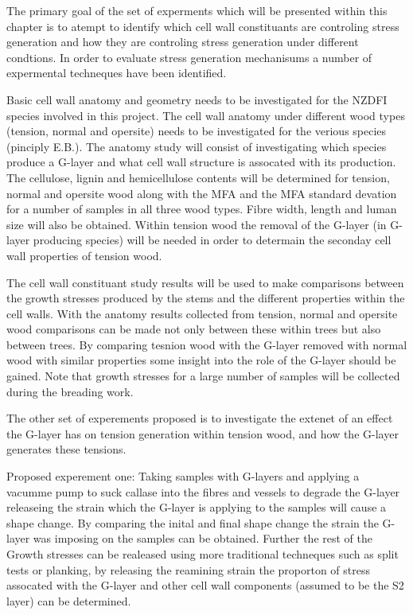 \documentclass{article}
\begin{document}
The primary goal of the set of experments which will be presented within this
chapter is to atempt to identify which cell wall constituants are controling
stress generation and how they are controling stress generation under different
condtions. In order to evaluate stress generation mechanisums a number of
expermental techneques have been identified.

Basic cell wall anatomy and geometry needs to be investigated for the NZDFI
species involved in this project. The cell wall anatomy under different wood
types (tension, normal and opersite) needs to be investigated for the verious
species (pinciply E.B.). The anatomy study will consist of investigating which
species produce a G-layer and what cell wall structure is assocated with its
production. The cellulose, lignin and hemicellulose contents will be determined
for tension, normal and opersite wood along with the MFA and the MFA standard
devation for a number of samples in all three wood types. Fibre width, length
and luman size will also be obtained. Within tension wood the removal of the
G-layer (in G-layer producing species) will be needed in order to determain the
seconday cell wall properties of tension wood.

The cell wall constituant study results will be used to make comparisons between
the growth stresses produced by the stems and the different properties within
the cell walls. With the anatomy results collected from tension, normal and
opersite wood comparisons can be made not only between these within trees but
also between trees. By comparing tesnion wood with the G-layer removed with
normal wood with similar properties some insight into the role of the G-layer
should be gained. Note that growth stresses for a large number of samples will
be collected during the breading work.

The other set of experements proposed is to investigate the extenet of an effect
the G-layer has on tension generation within tension wood, and how the G-layer
generates these tensions.

Proposed experement one:
Taking samples with G-layers and applying a vacumme pump to suck callase into
the fibres and vessels to degrade the G-layer releaseing the strain which the
G-layer is applying to the samples will cause a shape change. By comparing the
inital and final shape change the strain the G-layer was imposing on the samples
can be obtained. Further the rest of the Growth stresses can be realeased using
more traditional techneques such as split tests or planking, by releasing the
reamining strain the proporton of stress assocated with the G-layer and other
cell wall components (assumed to be the S2 layer) can be determined.
\end{document}
